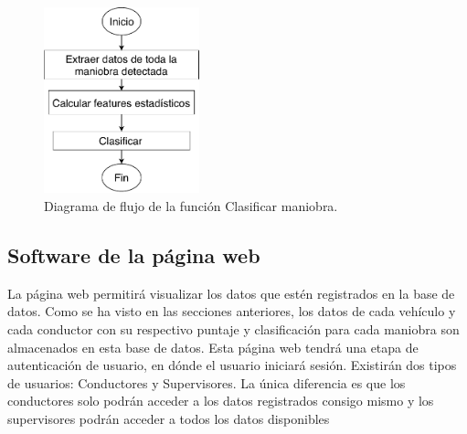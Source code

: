 \begin{figure}[hbt!]
\centering
\includegraphics[width=0.4\textwidth]{Flujo_servidor_clasificar.pdf}
\caption{Diagrama de flujo de la función Clasificar maniobra.}
\label{fig:Flujo_servidor_clasificar}
\end{figure}


\subsection{Software de la página web}

La página web permitirá visualizar los datos que estén registrados en la base de datos. Como se ha visto en las secciones anteriores, los datos de cada vehículo y cada conductor con su respectivo puntaje y clasificación para cada maniobra son almacenados en esta base de datos. Esta página web tendrá una etapa de autenticación de usuario, en dónde el usuario iniciará sesión. Existirán dos tipos de usuarios: Conductores y Supervisores. La única diferencia es que los conductores solo podrán acceder a los datos registrados consigo mismo y los supervisores podrán acceder a todos los datos disponibles




















